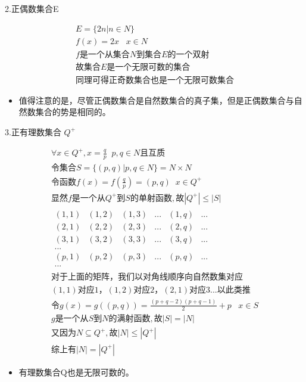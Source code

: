 \documentclass[12pt,a4paper,oneside]{ctexart}
\begin{document}
2.正偶数集合E

\[\begin{gathered}
E=\{2n|n\in N\}\\
f(x)=2x\;\;\;x\in N\\
f\text{是一个从集合}N\text{到集合}E\text{的一个双射}\\
\text{故集合}E\text{是一个无限可数的集合}\\
\text{同理可得正奇数集合也是一个无限可数集合}
\end{gathered}\]

\begin{itemize}
\item
  值得注意的是，尽管正偶数集合是自然数集合的真子集，但是正偶数集合与自然数集合的势是相同的。
\end{itemize}

3.正有理数集合 \(Q^+\)

\[\begin{gathered}
\forall x\in Q^+,x=\frac{q}{p}\;\;p,q\in N\text{且互质}\\
\text{令集合}S=\{(p,q)|p,q\in N\}=N\times N\\
\text{令函数}f(x)=f(\frac{q}{p})=(p,q)\;\;x\in Q^+\\
\text{显然}f\text{是一个从}Q^+\text{到}S\text{的单射函数},\text{故}|Q^+|\leqslant|S|\\
\begin{matrix}
(1,1)&(1,2)&(1,3)&...&(1,q)&...\\
(2,1)&(2,2)&(2,3)&...&(2,q)&...\\
(3,1)&(3,2)&(3,3)&...&(3,q)&...\\
...\\
(p,1)&(p,2)&(p,3)&...&(p,q)&...\\
...
\end{matrix}\\
\text{对于上面的矩阵}，\text{我们以对角线顺序向自然数集对应}\\
(1,1)\text{对应}1，(1,2)\text{对应}2，(2,1)\text{对应}3...\text{以此类推}\\
\text{令}g(x)=g((p,q))=\frac{(p+q-2)(p+q-1)}{2}+p\;\;\;x\in S\\
g\text{是一个从}S\text{到}N\text{的满射函数},\text{故}|S|=|N|\\
\text{又因为}N\subseteq Q^+,\text{故}|N|\leqslant|Q^+|\\
\text{综上有}|N|=|Q^+|
\end{gathered}\]

\begin{itemize}
\item
  有理数集合Q也是无限可数的。
\end{itemize}
\end{document}
